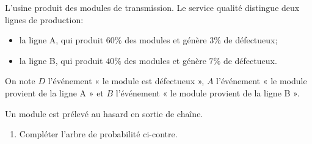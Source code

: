  \begin{minipage}{0.48\textwidth}
L'usine produit des modules de transmission. Le service qualité distingue deux lignes de production:

\begin{itemize}
    \item la ligne A, qui produit $60\%$ des modules et génère $3\%$ de défectueux;
    \item la ligne B, qui produit $40\%$ des modules et génère $7\%$ de défectueux.
\end{itemize}

On note $D$ l'événement « le module est défectueux », $A$ l'événement « le module provient de la ligne A » et $B$ l'événement « le module provient de la ligne B ».

Un module est prélevé au hasard en sortie de chaîne.

\medskip

\begin{enumerate}[series=monDS, resume]
    \item Compléter l'arbre de probabilité ci-contre.
\end{enumerate}

\end{minipage}\hfill{}

